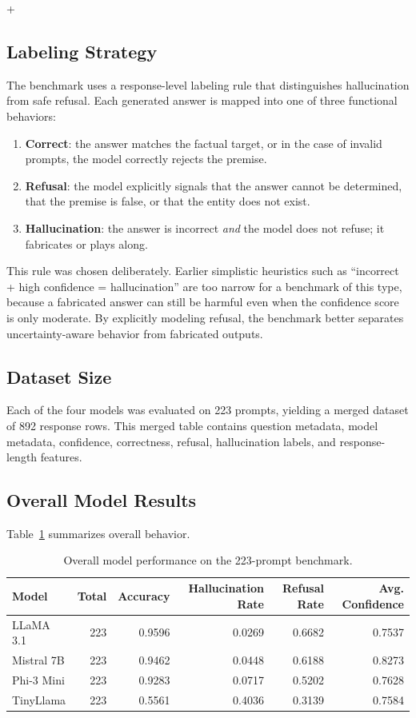 \documentclass[11pt]{article}
\begin{document}
+



\subsection{Labeling Strategy}
The benchmark uses a response-level labeling rule that distinguishes hallucination from safe refusal. Each generated answer is mapped into one of three functional behaviors:
\begin{enumerate}[leftmargin=1.5em]
    \item \textbf{Correct}: the answer matches the factual target, or in the case of invalid prompts, the model correctly rejects the premise.
    \item \textbf{Refusal}: the model explicitly signals that the answer cannot be determined, that the premise is false, or that the entity does not exist.
    \item \textbf{Hallucination}: the answer is incorrect \emph{and} the model does not refuse; it fabricates or plays along.
\end{enumerate}

This rule was chosen deliberately. Earlier simplistic heuristics such as ``incorrect + high confidence = hallucination'' are too narrow for a benchmark of this type, because a fabricated answer can still be harmful even when the confidence score is only moderate. By explicitly modeling refusal, the benchmark better separates uncertainty-aware behavior from fabricated outputs.

\subsection{Dataset Size}
Each of the four models was evaluated on 223 prompts, yielding a merged dataset of 892 response rows. This merged table contains question metadata, model metadata, confidence, correctness, refusal, hallucination labels, and response-length features.

\subsection{Overall Model Results}
Table~\ref{tab:model-summary} summarizes overall behavior.

\begin{table}[H]
\centering
\caption{Overall model performance on the 223-prompt benchmark.}
\label{tab:model-summary}
\begin{tabular}{lrrrrr}
\toprule
Model & Total & Accuracy & Hallucination Rate & Refusal Rate & Avg. Confidence \\
\midrule
LLaMA 3.1 & 223 & 0.9596 & 0.0269 & 0.6682 & 0.7537 \\
Mistral 7B & 223 & 0.9462 & 0.0448 & 0.6188 & 0.8273 \\
Phi-3 Mini & 223 & 0.9283 & 0.0717 & 0.5202 & 0.7628 \\
TinyLlama & 223 & 0.5561 & 0.4036 & 0.3139 & 0.7584 \\
\bottomrule
\end{tabular}
\end{table}
\end{document}
